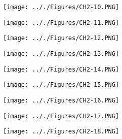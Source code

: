 \documentclass[onecolumn,11pt]{report}
\def\lthtmlcheckvsize{\ifdim\ht\sizebox<\vsize 
  \ifdim\wd\sizebox<\hsize\expandafter\hfill\fi \expandafter\vfill
  \else\expandafter\vss\fi}%
\begin{document}
{\newpage\clearpage
{}%
\texttt{[image: .././Figures/CH2-10.PNG]}%
\lthtmlpictureZ
\lthtmlcheckvsize\clearpage}

{\newpage\clearpage
{}%
\texttt{[image: .././Figures/CH2-11.PNG]}%
\lthtmlpictureZ
\lthtmlcheckvsize\clearpage}

{\newpage\clearpage
{}%
\texttt{[image: .././Figures/CH2-12.PNG]}%
\lthtmlpictureZ
\lthtmlcheckvsize\clearpage}

{\newpage\clearpage
{}%
\texttt{[image: .././Figures/CH2-13.PNG]}%
\lthtmlpictureZ
\lthtmlcheckvsize\clearpage}

{\newpage\clearpage
{}%
\texttt{[image: .././Figures/CH2-14.PNG]}%
\lthtmlpictureZ
\lthtmlcheckvsize\clearpage}

{\newpage\clearpage
{}%
\texttt{[image: .././Figures/CH2-15.PNG]}%
\lthtmlpictureZ
\lthtmlcheckvsize\clearpage}

{\newpage\clearpage
{}%
\texttt{[image: .././Figures/CH2-16.PNG]}%
\lthtmlpictureZ
\lthtmlcheckvsize\clearpage}

{\newpage\clearpage
{}%
\texttt{[image: .././Figures/CH2-17.PNG]}%
\lthtmlpictureZ
\lthtmlcheckvsize\clearpage}

{\newpage\clearpage
{}%
\texttt{[image: .././Figures/CH2-18.PNG]}%
\lthtmlpictureZ
\lthtmlcheckvsize\clearpage}
\end{document}
